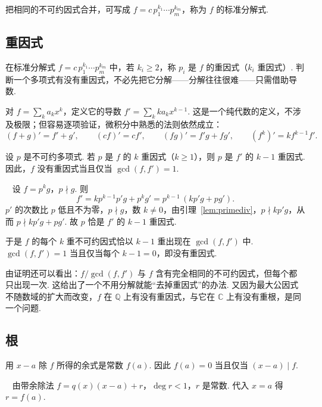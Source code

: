 \documentclass[lang=cn,10.5pt,scheme=chinese,toc=twocol,section,chinesefont=nofont,
twoside,citestyle=gb7714-2015,bibstyle=gb7714-2015]{elegantbook}
\DeclareRobustCommand{\textbf}[1]{{\lnsemiboldlatin\lnsemiboldcjk #1}}
\numberwithin{equation}{section}   %
\newcommand{\hC}{\texorpdfstring{\textdaggerdbl}{‡}}
\newcommand*{\lnlabel}[1]{{\sffamily\bfseries\color{black}#1}}
\renewenvironment{proof}{%
	\par\noindent\lnlabel{\proofname}\;\ \color{black!90}\cfs}{\par}
\begin{document}
把相同的不可约因式合并，可写成 $f=c\,p_1^{k_1}\cdots p_m^{k_m}$，称为 $f$ 的\textbf{标准分解式}.

\subsection{\hC 重因式}

在标准分解式 $f=c\,p_1^{k_1}\cdots p_m^{k_m}$ 中，若 $k_i\ge2$，称 $p_i$ 是 $f$ 的\textbf{重因式}（$k_i$ 重因式）. 判断一个多项式有没有重因式，不必先把它分解——分解往往很难——只需借助导数.

对 $f=\sum_k a_kx^k$，定义它的\textbf{导数} $f'=\sum_k ka_kx^{k-1}$. 这是一个纯代数的定义，不涉及极限；但容易逐项验证，微积分中熟悉的法则依然成立：
\[(f+g)'=f'+g',\qquad(cf)'=cf',\qquad(fg)'=f'g+fg',\qquad(f^k)'=kf^{k-1}f'.\]

\begin{theorem}
  \label{thm:multfactor}
  设 $p$ 是不可约多项式. 若 $p$ 是 $f$ 的 $k$ 重因式（$k\ge1$），则 $p$ 是 $f'$ 的 $k-1$ 重因式. 因此，$f$ 没有重因式当且仅当 $\gcd(f,f')=1$.
\end{theorem}
\begin{proof}
  设 $f=p^kg$，$p\nmid g$. 则
  \[f'=kp^{k-1}p'g+p^kg'=p^{k-1}\,(kp'g+pg').\]
  $p'$ 的次数比 $p$ 低且不为零，$p\nmid g$，数 $k\ne0$，由引理~\ref{lem:primediv}，$p\nmid kp'g$，从而 $p\nmid kp'g+pg'$. 故 $p$ 恰是 $f'$ 的 $k-1$ 重因式.

  于是 $f$ 的每个 $k$ 重不可约因式恰以 $k-1$ 重出现在 $\gcd(f,f')$ 中. $\gcd(f,f')=1$ 当且仅当每个 $k-1=0$，即没有重因式.
\end{proof}

由证明还可以看出：$f/\gcd(f,f')$ 与 $f$ 含有完全相同的不可约因式，但每个都只出现一次. 这给出了一个不用分解就能“去掉重因式”的办法. 又因为最大公因式不随数域的扩大而改变，$f$ 在 $\mathbb{Q}$ 上有没有重因式，与它在 $\mathbb{C}$ 上有没有重根，是同一个问题.

\subsection{根}

\begin{theorem}[余数定理]\label{thm:remainder}
  用 $x-a$ 除 $f$ 所得的余式是常数 $f(a)$. 因此 $f(a)=0$ 当且仅当 $(x-a)\mid f$.
\end{theorem}
\begin{proof}
  由带余除法 $f=q(x)(x-a)+r$，$\deg r<1$，$r$ 是常数. 代入 $x=a$ 得 $r=f(a)$.
\end{proof}
\end{document}
